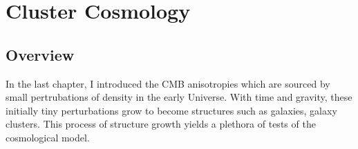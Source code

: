 \chapter{Cluster Cosmology}
\label{ch:clusters}
\section{Overview}
In the last chapter, I introduced the CMB anisotropies which are sourced by small pertrubations of density in the early Universe.
With time and gravity, these initially tiny perturbations grow to become structures such as galaxies, galaxy clusters.
This process of structure growth yields a plethora of tests of the cosmological model.
